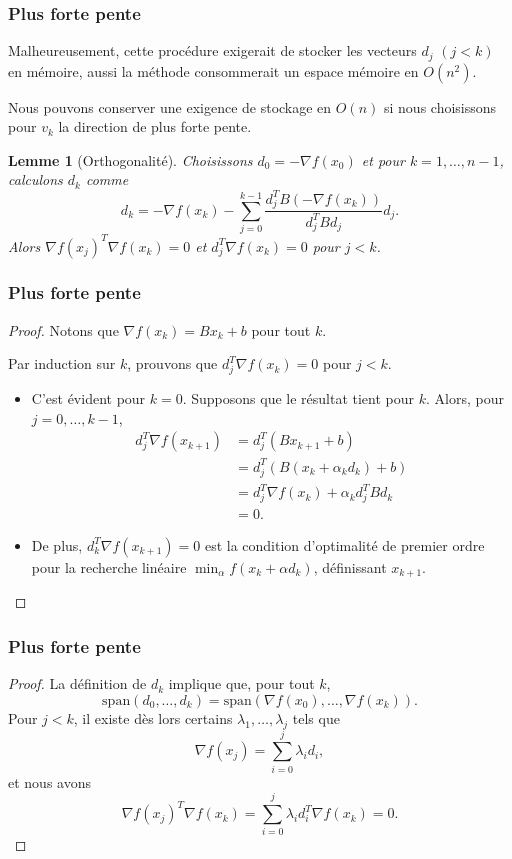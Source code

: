 \documentclass[usepdftitle=false,aspectratio=169]{beamer}
\newtheorem{lem}{Lemme}
\begin{document}
\begin{frame}
\frametitle{Plus forte pente}

Malheureusement, cette procédure exigerait de stocker les vecteurs $d_j$ $(j < k)$ en mémoire, aussi la méthode consommerait un espace mémoire en $O(n^2)$.

\mbox{}

Nous pouvons conserver une exigence de stockage en $O(n)$ si nous choisissons pour $v_k$ la direction de plus forte pente.

\begin{lem}[Orthogonalité]
Choisissons $d_0 = -\nabla f(x_0)$ et pour $k = 1,\ldots, n-1$, calculons $d_k$ comme
$$
d_k = -\nabla f(x_k) - \sum_{j = 0}^{k-1} \frac{d_j^TB(-\nabla f(x_k))}{d_j^TBd_j} d_j.
$$
Alors $\nabla f(x_j)^T \nabla f(x_k) = 0$ et $d_j^T \nabla f(x_k) = 0$ pour $j < k$.
\end{lem}

\end{frame}

\begin{frame}
\frametitle{Plus forte pente}

\begin{proof}
Notons que $\nabla f(x_k) = B x_k + b$ pour tout $k$.

Par induction sur $k$, prouvons que $d_j^T \nabla f(x_k) = 0$ pour $j < k$.
\begin{itemize}
\item
C'est évident pour $k = 0$.
Supposons que le résultat tient pour $k$.
Alors, pour $j = 0,\ldots,k-1$,
\begin{align*}
d_j^T \nabla f(x_{k + 1})
&= d_j^T (B x_{k+1} + b) \\
&= d_j^T (B (x_k+ \alpha_kd_k) + b) \\
&= d_j^T \nabla f(x_k) + \alpha_k d_j^T B d_k \\
&= 0.
\end{align*}
\item
De plus,
$d_k^T \nabla f(x_{k + 1}) = 0$
est la condition d'optimalité de premier ordre pour la recherche linéaire $\min_{\alpha} f(x_k + \alpha d_k)$, définissant $x_{k+1}$.

\end{itemize}
\end{proof}

\end{frame}

\begin{frame}
\frametitle{Plus forte pente}

\begin{proof}
La définition de $d_k$ implique que, pour tout $k$,
$$
\mbox{span}(d_0,\ldots, d_k)
= \mbox{span}(\nabla f(x_0),\ldots, \nabla f(x_k)).
$$
Pour $j < k$, il existe dès lors certains $\lambda_1,\ldots, \lambda_j$ tels que
$$
\nabla f(x_j) = \sum_{i = 0}^j \lambda_i d_i,
$$
et nous avons
$$
\nabla f(x_j)^T \nabla f(x_k)
=  \sum_{i = 0}^j \lambda_i d_i^T \nabla f(x_k) = 0.
$$
\end{proof}

\end{frame}
\end{document}
